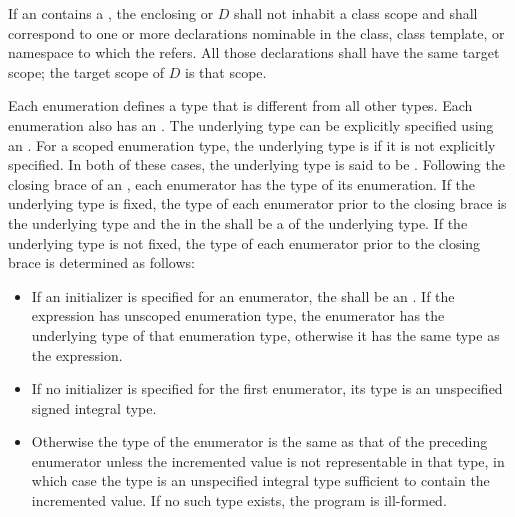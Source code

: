 \pnum
If an  contains a
,
the enclosing 
or  $D$
shall not inhabit a class scope and
shall correspond to one or more declarations nominable
in the class, class template, or namespace
to which the  refers.
All those declarations shall have the same target scope;
the target scope of $D$ is that scope.

\pnum
{}%
%
Each enumeration defines a type that is different from all other types.
Each enumeration also has an .
The underlying type can be explicitly specified using an .
For a scoped enumeration type, the underlying type is  if it is not
explicitly specified. In both of these cases, the underlying type is said to be
.
Following the closing brace of an , each
enumerator has the type of its enumeration.
If the underlying type is fixed, the type of each enumerator
prior to the closing brace is the underlying
type
and the  in the 
shall be a
of the underlying type.
If the underlying
type is not fixed,
the type of each enumerator prior to the closing brace is determined as
follows:
\begin{itemize}
\item If an
initializer is specified for an enumerator, the
 shall be an
.
If the expression has
unscoped enumeration type, the enumerator has the underlying type of that
enumeration type, otherwise it has the same type as the expression.

\item If no initializer is specified for the
first enumerator, its type is an unspecified signed integral type.

\item  Otherwise
the type of the enumerator is the same as that of the
preceding enumerator unless the incremented value is not representable
in that type, in which case the type is an unspecified integral type
sufficient to contain the incremented value. If no such type exists, the program
is ill-formed.
\end{itemize}

